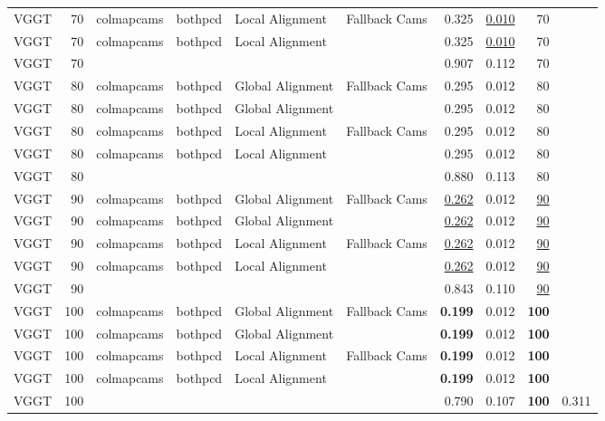 \begin{table}[H]
\begin{tabular}{lrllllrrrr}
VGGT & 70 & colmapcams & bothpcd & Local Alignment & Fallback Cams & 0.325 & \underline{0.010} & 70 &  \\
VGGT & 70 & colmapcams & bothpcd & Local Alignment &  & 0.325 & \underline{0.010} & 70 &  \\
VGGT & 70 &  &  &  &  & 0.907 & 0.112 & 70 &  \\
VGGT & 80 & colmapcams & bothpcd & Global Alignment & Fallback Cams & 0.295 & 0.012 & 80 &  \\
VGGT & 80 & colmapcams & bothpcd & Global Alignment &  & 0.295 & 0.012 & 80 &  \\
VGGT & 80 & colmapcams & bothpcd & Local Alignment & Fallback Cams & 0.295 & 0.012 & 80 &  \\
VGGT & 80 & colmapcams & bothpcd & Local Alignment &  & 0.295 & 0.012 & 80 &  \\
VGGT & 80 &  &  &  &  & 0.880 & 0.113 & 80 &  \\
VGGT & 90 & colmapcams & bothpcd & Global Alignment & Fallback Cams & \underline{0.262} & 0.012 & \underline{90} &  \\
VGGT & 90 & colmapcams & bothpcd & Global Alignment &  & \underline{0.262} & 0.012 & \underline{90} &  \\
VGGT & 90 & colmapcams & bothpcd & Local Alignment & Fallback Cams & \underline{0.262} & 0.012 & \underline{90} &  \\
VGGT & 90 & colmapcams & bothpcd & Local Alignment &  & \underline{0.262} & 0.012 & \underline{90} &  \\
VGGT & 90 &  &  &  &  & 0.843 & 0.110 & \underline{90} &  \\
VGGT & 100 & colmapcams & bothpcd & Global Alignment & Fallback Cams & \textbf{0.199} & 0.012 & \textbf{100} &  \\
VGGT & 100 & colmapcams & bothpcd & Global Alignment &  & \textbf{0.199} & 0.012 & \textbf{100} &  \\
VGGT & 100 & colmapcams & bothpcd & Local Alignment & Fallback Cams & \textbf{0.199} & 0.012 & \textbf{100} &  \\
VGGT & 100 & colmapcams & bothpcd & Local Alignment &  & \textbf{0.199} & 0.012 & \textbf{100} &  \\
VGGT & 100 &  &  &  &  & 0.790 & 0.107 & \textbf{100} & 0.311 \\
\bottomrule
\end{tabular}
\end{table}
